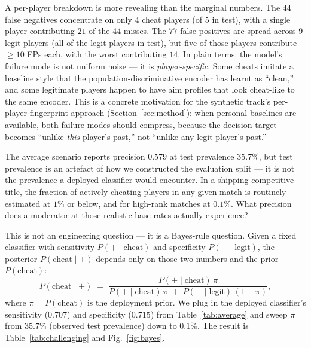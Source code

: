 \documentclass[conference,10pt]{IEEEtran}
\begin{document}
A per-player breakdown is more revealing than the marginal numbers.
The $44$ false negatives concentrate on only $4$ cheat players (of $5$
in test), with a single player contributing $21$ of the $44$ misses.
The $77$ false positives are spread across $9$ legit players (all of
the legit players in test), but five of those players contribute
$\ge 10$ FPs each, with the worst contributing $14$. In plain terms:
the model's failure mode is not uniform noise --- it is
\emph{player-specific}. Some cheats imitate a baseline style that the
population-discriminative encoder has learnt as ``clean,'' and some
legitimate players happen to have aim profiles that look cheat-like
to the same encoder. This is a concrete motivation for the synthetic
track's per-player fingerprint approach (Section~\ref{sec:method}):
when personal baselines are available, both failure modes should
compress, because the decision target becomes ``unlike \emph{this}
player's past,'' not ``unlike any legit player's past.''



The average scenario reports precision $0.579$ at test prevalence
$35.7\%$, but test prevalence is an artefact of how we constructed the
evaluation split --- it is not the prevalence a deployed classifier
would encounter. In a shipping competitive title, the fraction of
actively cheating players in any given match is routinely estimated at
$1\%$ or below, and for high-rank matches at $0.1\%$. What precision
does a moderator at those realistic base rates actually experience?

This is not an engineering question --- it is a Bayes-rule question.
Given a fixed classifier with sensitivity $P(+\mid\text{cheat})$ and
specificity $P(-\mid\text{legit})$, the posterior
$P(\text{cheat}\mid +)$ depends only on those two numbers and the prior
$P(\text{cheat})$:
\begin{equation}
P(\text{cheat}\mid +) \;=\;
\frac{P(+\mid\text{cheat})\,\pi}
     {P(+\mid\text{cheat})\,\pi \;+\;
      P(+\mid\text{legit})\,(1-\pi)},
\label{eq:bayes}
\end{equation}
where $\pi = P(\text{cheat})$ is the deployment prior.
We plug in the deployed classifier's sensitivity ($0.707$) and
specificity ($0.715$) from Table~\ref{tab:average} and sweep $\pi$
from $35.7\%$ (observed test prevalence) down to $0.1\%$. The result is
Table~\ref{tab:challenging} and Fig.~\ref{fig:bayes}.
\end{document}
